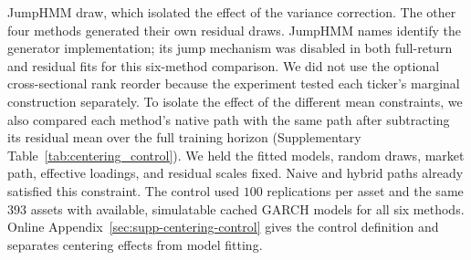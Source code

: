 JumpHMM draw, which isolated the effect of the variance correction. The
other four methods generated their own residual draws. JumpHMM names
identify the generator implementation; its jump mechanism was disabled
in both full-return and residual fits for this six-method comparison.
We did not use the optional cross-sectional rank reorder because the
experiment tested each ticker's marginal construction separately.
To isolate the effect of the different mean constraints, we also
compared each method's native path with the same path after subtracting
its residual mean over the full training horizon
(Supplementary Table~\ref{tab:centering_control}). We held the fitted models,
random draws, market path, effective loadings, and residual scales
fixed. Naive and hybrid paths already satisfied this constraint.
The control used $100$ replications per asset and the same $393$
assets with available, simulatable cached GARCH models for all six
methods. Online Appendix~\ref{sec:supp-centering-control} gives the
control definition and separates centering effects from model fitting.

